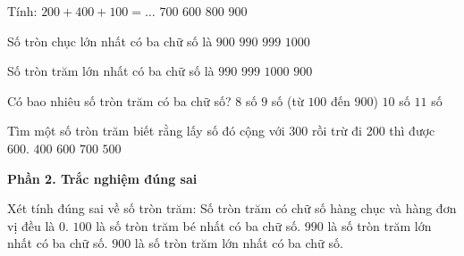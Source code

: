 \begin{ex} %
Tính: $200 + 400 + 100 = \dots$
\choice
{\True $700$}
{$600$}
{$800$}
{$900$}
\end{ex}

\begin{ex} %
Số tròn chục lớn nhất có ba chữ số là
\choice
{$900$}
{\True $990$}
{$999$}
{$1000$}
\end{ex}

\begin{ex} %
Số tròn trăm lớn nhất có ba chữ số là
\choice
{$990$}
{$999$}
{$1000$}
{\True $900$}
\end{ex}

\begin{ex} %
Có bao nhiêu số tròn trăm có ba chữ số?
\choice
{$8$ số}
{\True $9$ số (từ $100$ đến $900$)}
{$10$ số}
{$11$ số}
\end{ex}

\begin{ex} %
Tìm một số tròn trăm biết rằng lấy số đó cộng với 300 rồi trừ đi 200 thì được 600.
\choice
{$400$}
{$600$}
{$700$}
{\True $500$}
\end{ex}

\textbf{Phần 2. Trắc nghiệm đúng sai}

\begin{ex} %
Xét tính đúng sai về số tròn trăm:
\choiceTF
{\True Số tròn trăm có chữ số hàng chục và hàng đơn vị đều là 0.}
{\True $100$ là số tròn trăm bé nhất có ba chữ số.}
{$990$ là số tròn trăm lớn nhất có ba chữ số.}
{\True $900$ là số tròn trăm lớn nhất có ba chữ số.}
\end{ex}

